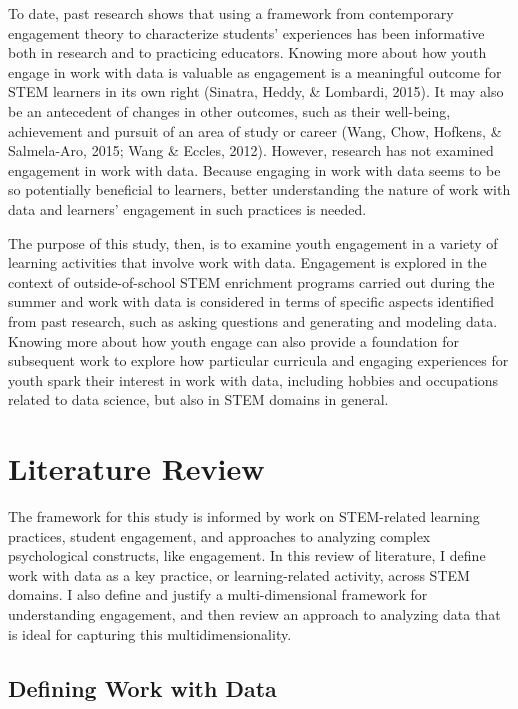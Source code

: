 \documentclass[]{msu-thesis}
\theoremstyle{definition}
\theoremstyle{definition}
\theoremstyle{definition}
\theoremstyle{remark}
\begin{document}
To date, past research shows that using a framework from contemporary
engagement theory to characterize students' experiences has been
informative both in research and to practicing educators. Knowing more
about how youth engage in work with data is valuable as engagement is a
meaningful outcome for STEM learners in its own right (Sinatra, Heddy,
\& Lombardi, 2015). It may also be an antecedent of changes in other
outcomes, such as their well-being, achievement and pursuit of an area
of study or career (Wang, Chow, Hofkens, \& Salmela-Aro, 2015; Wang \&
Eccles, 2012). However, research has not examined engagement in work
with data. Because engaging in work with data seems to be so potentially
beneficial to learners, better understanding the nature of work with
data and learners' engagement in such practices is needed.

The purpose of this study, then, is to examine youth engagement in a
variety of learning activities that involve work with data. Engagement
is explored in the context of outside-of-school STEM enrichment programs
carried out during the summer and work with data is considered in terms
of specific aspects identified from past research, such as asking
questions and generating and modeling data. Knowing more about how youth
engage can also provide a foundation for subsequent work to explore how
particular curricula and engaging experiences for youth spark their
interest in work with data, including hobbies and occupations related to
data science, but also in STEM domains in general.

\chapter{Literature Review}\label{literature-review}

The framework for this study is informed by work on STEM-related
learning practices, student engagement, and approaches to analyzing
complex psychological constructs, like engagement. In this review of
literature, I define work with data as a key practice, or
learning-related activity, across STEM domains. I also define and
justify a multi-dimensional framework for understanding engagement, and
then review an approach to analyzing data that is ideal for capturing
this multidimensionality.

\section{Defining Work with Data}\label{defining-work-with-data}
\end{document}
